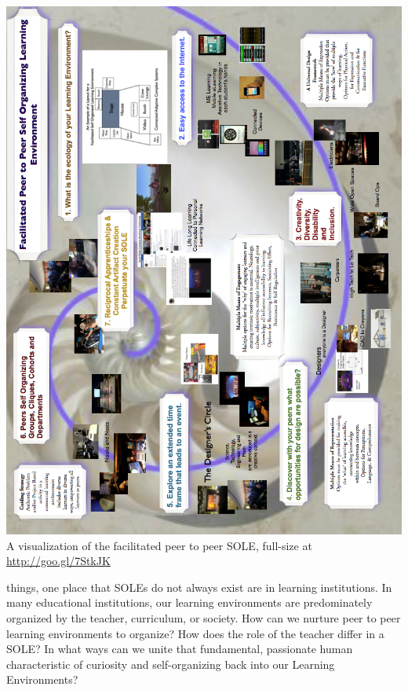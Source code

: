 \clearpage
\begin{vplace}[0.5]
\noindent \includegraphics[width=\textwidth]{../pictures/sole-l.jpg}
A visualization of the facilitated peer to peer SOLE, full-size
at \url{http://goo.gl/7StkJK}
\end{vplace}
\clearpage

\noindent things, one place that SOLEs do not always exist are in
learning institutions. In many educational institutions, our learning
environments are predominately organized by the teacher, curriculum,
or society. How can we nurture peer to peer learning environments to
organize? How does the role of the teacher differ in a SOLE? In what
ways can we unite that fundamental, passionate human characteristic of
curiosity and self-organizing back into our Learning Environments?

